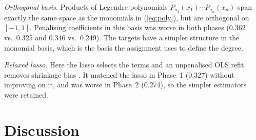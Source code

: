 \documentclass[conference]{IEEEtran}
\begin{document}
\emph{Orthogonal basis.} Products of Legendre polynomials $P_{a_1}(x_1)\cdots P_{a_n}(x_n)$ \cite{xiu2002} span exactly the same space as the monomials in (\ref{eq:poly}), but are orthogonal on $[-1,1]$. Penalising coefficients in this basis was worse in both phases (0.362 vs.\ 0.325 and 0.346 vs.\ 0.249). The targets have a simpler structure in the monomial basis, which is the basis the assignment uses to define the degree.

\emph{Relaxed lasso.} Here the lasso selects the terms and an unpenalised OLS refit removes shrinkage bias \cite{meinshausen2007}. It matched the lasso in Phase~1 (0.327) without improving on it, and was worse in Phase~2 (0.274), so the simpler estimators were retained.


\section{Discussion}\label{sec:disc}
\end{document}
